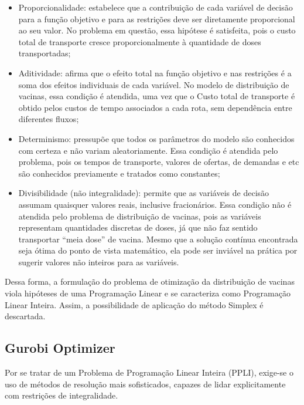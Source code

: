 \begin{itemize}
\item Proporcionalidade: estabelece que a contribuição de cada variável de decisão para a função objetivo e para as restrições deve ser diretamente proporcional ao seu valor. No problema em questão, essa hipótese é satisfeita, pois o custo total de transporte cresce proporcionalmente à quantidade de doses transportadas;

\item Aditividade: afirma que o efeito total na função objetivo e nas restrições é a soma dos efeitos individuais de cada variável. No modelo de distribuição de vacinas, essa condição é atendida, uma vez que o Custo total de transporte é obtido pelos custos de tempo associados a cada rota, sem dependência entre diferentes fluxos;

\item Determinismo: pressupõe que todos os parâmetros do modelo são conhecidos com certeza e não variam aleatoriamente. Essa condição é atendida pelo problema, pois os tempos de transporte, valores de ofertas, de demandas e etc são conhecidos previamente e tratados como constantes;

\item Divisibilidade (não integralidade): permite que as variáveis de decisão assumam quaisquer valores reais, inclusive fracionários. Essa condição não é atendida pelo problema de distribuição de vacinas, pois as variáveis representam quantidades discretas de doses, já que não faz sentido transportar ``meia dose'' de vacina. Mesmo que a solução contínua encontrada seja ótima do ponto de vista matemático, ela pode ser inviável na prática por sugerir valores não inteiros para as variáveis.
\end{itemize}

Dessa forma, a formulação do problema de otimização da distribuição de vacinas viola hipóteses de uma Programação Linear e se caracteriza como Programação Linear Inteira. Assim, a possibilidade de aplicação do método Simplex é descartada.

\subsection{Gurobi Optimizer}

Por se tratar de um Problema de Programação Linear Inteira (PPLI), exige-se o uso de métodos de resolução mais sofisticados, capazes de lidar explicitamente com restrições de integralidade.

